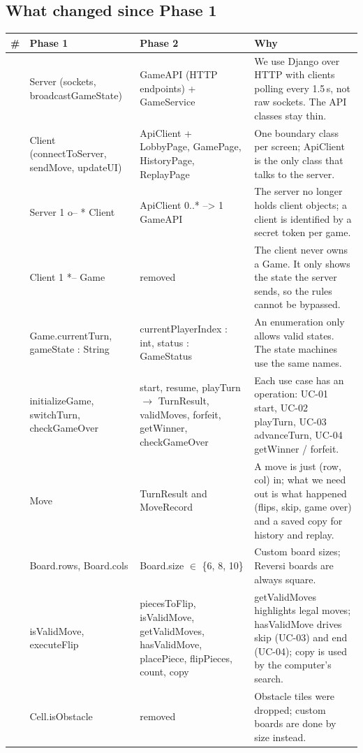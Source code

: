 \documentclass[11pt,a4paper]{article}
\begin{document}
\subsection{What changed since Phase 1}
\small
\begin{longtable}{>{\raggedright\arraybackslash}p{0.4cm} >{\raggedright\arraybackslash}p{3.7cm} >{\raggedright\arraybackslash}p{4.3cm} >{\raggedright\arraybackslash}p{6.3cm}}
\toprule
\textbf{\#} & \textbf{Phase 1} & \textbf{Phase 2} & \textbf{Why}\\ \midrule\endhead
1 & Server (sockets, broadcastGameState) & GameAPI (HTTP endpoints) + GameService & We use Django over HTTP with clients polling every 1.5\,s, not raw sockets. The API classes stay thin.\\
2 & Client (connectToServer, sendMove, updateUI) & ApiClient + LobbyPage, GamePage, HistoryPage, ReplayPage & One boundary class per screen; ApiClient is the only class that talks to the server.\\
3 & Server 1 o-- * Client & ApiClient 0..* --> 1 GameAPI & The server no longer holds client objects; a client is identified by a secret token per game.\\
4 & Client 1 *-- Game & removed & The client never owns a Game. It only shows the state the server sends, so the rules cannot be bypassed.\\
5 & Game.currentTurn, gameState : String & currentPlayerIndex : int, status : GameStatus & An enumeration only allows valid states. The state machines use the same names.\\
6 & initializeGame, switchTurn, checkGameOver & start, resume, playTurn $\to$ TurnResult, validMoves, forfeit, getWinner, checkGameOver & Each use case has an operation: UC-01 start, UC-02 playTurn, UC-03 advanceTurn, UC-04 getWinner / forfeit.\\
7 & Move & TurnResult and MoveRecord & A move is just (row, col) in; what we need out is what happened (flips, skip, game over) and a saved copy for history and replay.\\
8 & Board.rows, Board.cols & Board.size $\in$ \{6, 8, 10\} & Custom board sizes; Reversi boards are always square.\\
9 & isValidMove, executeFlip & piecesToFlip, isValidMove, getValidMoves, hasValidMove, placePiece, flipPieces, count, copy & getValidMoves highlights legal moves; hasValidMove drives skip (UC-03) and end (UC-04); copy is used by the computer's search.\\
10 & Cell.isObstacle & removed & Obstacle tiles were dropped; custom boards are done by size instead.\\

\end{longtable}
\end{document}
